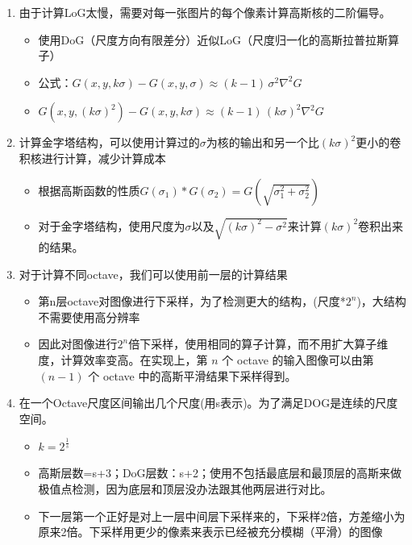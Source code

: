 \documentclass[UTF8]{ctexart}
\begin{document}
\begin{enumerate}
    \item 由于计算LoG太慢，需要对每一张图片的每个像素计算高斯核的二阶偏导。
    \begin{itemize}
        \item  使用DoG（尺度方向有限差分）近似LoG（尺度归一化的高斯拉普拉斯算子）
        \item 公式：$G(x,y,k\sigma)-G(x,y,\sigma)\approx (k-1)\,\sigma^2\nabla^2 G$
        \item $G(x,y,(k\sigma)^2)-G(x,y,k\sigma)\approx (k-1)\,(k\sigma)^2\nabla^2 G$

    \end{itemize}

    \item 计算金字塔结构，可以使用计算过的$\sigma$为核的输出和另一个比$(k\sigma)^2$更小的卷积核进行计算，减少计算成本
    \begin{itemize}
        \item 根据高斯函数的性质$G(\sigma_1) * G(\sigma_2) = G\!\left(\sqrt{\sigma_1^2 + \sigma_2^2}\right)$
        \item 对于金字塔结构，使用尺度为$\sigma$以及$\sqrt{(k\sigma)^2-\sigma^2}$来计算$(k\sigma)^2$卷积出来的结果。
    \end{itemize}

    \item 对于计算不同octave，我们可以使用前一层的计算结果
    \begin{itemize}
        \item 第n层octave对图像进行下采样，为了检测更大的结构，(尺度*$2^n$)，大结构不需要使用高分辨率
        \item 因此对图像进行$2^n$倍下采样，使用相同的算子计算，而不用扩大算子维度，计算效率变高。在实现上，第 $n$ 个 octave 的输入图像可以由第 $(n-1)$ 个 octave 中的高斯平滑结果下采样得到。
    \end{itemize}

    \item 在一个Octave尺度区间输出几个尺度(用s表示)。为了满足DOG是连续的尺度空间。
    \begin{itemize}
        \item $k=2^{\frac{1}{s}}$
        \item 高斯层数=s+3；DoG层数：s+2；使用不包括最底层和最顶层的高斯来做极值点检测，因为底层和顶层没办法跟其他两层进行对比。
        \item 下一层第一个正好是对上一层中间层下采样来的，下采样2倍，方差缩小为原来2倍。下采样用更少的像素来表示已经被充分模糊（平滑）的图像
    \end{itemize}
    
\end{enumerate}
\end{document}
